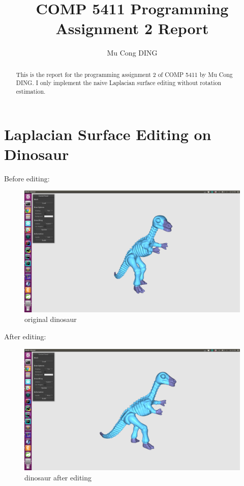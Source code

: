 \documentclass[twocolumn, a4paper]{article}
\title{COMP 5411 Programming Assignment 2 Report}
\author{Mu Cong DING}
\begin{document}
\maketitle

\begin{abstract}
This is the report for the programming assignment 2 of COMP 5411 by Mu Cong DING. I only implement the naive Laplacian surface editing without rotation estimation.
\end{abstract}

\section{Laplacian Surface Editing on Dinosaur}
Before editing:
\begin{figure}[H]
	\centering
	\includegraphics[width=1.0\linewidth]{dinosaur_before.png}
	\caption{original dinosaur}
\end{figure}
After editing:
\begin{figure}[H]
	\centering
	\includegraphics[width=1.0\linewidth]{dinosaur_after1.png}
	\caption{dinosaur after editing}
\end{figure}
\end{document}
